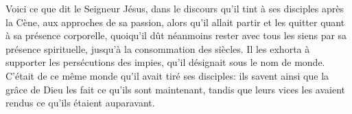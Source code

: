 Voici ce que dit le Seigneur Jésus,
	dans le discours qu’il tint à ses disciples après la Cène,
	aux approches de sa passion,
	alors qu’il allait partir et les quitter quant à sa présence corporelle,
	quoiqu’il dût néanmoins rester avec tous les siens
		par sa présence spirituelle,
	jusqu’à la consommation des siècles.
Il les exhorta à supporter les persécutions des impies,
	qu’il désignait sous le nom de monde.
C’était de ce même monde qu’il avait tiré ses disciples:
	ils savent ainsi que la grâce de Dieu les fait ce qu’ils sont maintenant,
	tandis que leurs vices les avaient rendus ce qu’ils étaient auparavant.
